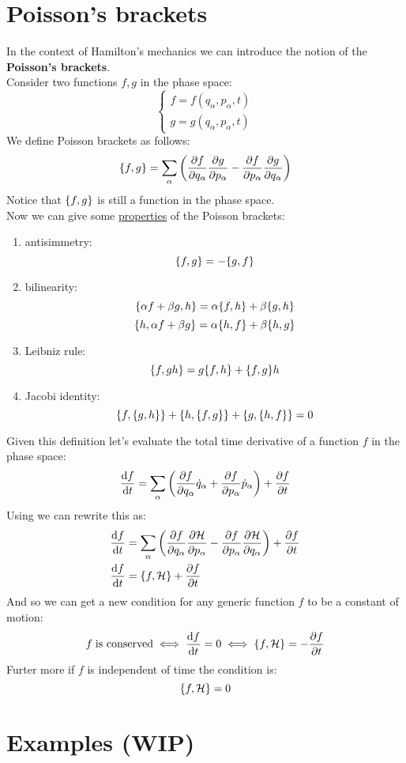 \section{Poisson's brackets}
In the context of Hamilton's mechanics we can introduce the notion of the \textbf{Poisson's brackets}.\\
Consider two functions $f,g$ in the phase space:
\begin{equation}
    \begin{cases}
        f = f(q_{\alpha},p_{\alpha},t)\\
        g = g(q_{\alpha},p_{\alpha},t)
    \end{cases}
\end{equation}
We define Poisson brackets as follows:
\begin{equation}
    \pb{f}{g} = \bigsum_{\alpha}\brackets{\pdv{f}{q_{\alpha}}\pdv{g}{p_\alpha} - \pdv{f}{p_{\alpha}}\pdv{g}{q_{\alpha}}}
\end{equation}
Notice that $\pb{f}{g}$ is still a function in the phase space.\\
Now we can give some \underline{properties} of the Poisson brackets:
\begin{enumerate}
    \item antisimmetry: \[\pb{f}{g} = - \pb{g}{f}\]
    \item bilinearity:
    \[\pb{\alpha f + \beta g}{h} = \alpha\pb{f}{h}+ \beta\pb{g}{h}\]
    \[\pb{h}{\alpha f + \beta g} = \alpha\pb{h}{f}+ \beta\pb{h}{g}\]
    \item Leibniz rule: \[\pb{f}{gh} = g\pb{f}{h} + \pb{f}{g}h\]
    \item Jacobi identity: \[\pb{f}{\pb{g}{h}} + \pb{h}{\pb{f}{g}} + \pb{g}{\pb{h}{f}} = 0\]
\end{enumerate}
Given this definition let's evaluate the total time derivative of a function $f$ in the phase space:
\begin{equation}
    \dv{f}{t} = \bigsum_{\alpha}\brackets{\pdv{f}{q_{\alpha}}\dot{q}_{\alpha} + \pdv{f}{p_{\alpha}}\dot{p}_{\alpha}} + \pdv{f}{t}
\end{equation}
Using \hamiltonref\;we can rewrite this as:
\begin{equation}
    \begin{split}
        \dv{f}{t} &= \bigsum_{\alpha}\brackets{\pdv{f}{q_{\alpha}}\pdv{\hamfun}{p_{\alpha}} - \pdv{f}{p_{\alpha}}\pdv{\hamfun}{q_{\alpha}}} + \pdv{f}{t}\\
        \dv{f}{t} &= \pb{f}{\hamfun} + \pdv{f}{t}
    \end{split}
\end{equation}
And so we can get a new condition for any generic function $f$ to be a constant of motion:
\begin{equation}
    f\;\text{is conserved} \iff \dv{f}{t} = 0 \iff \pb{f}{\hamfun} = -\pdv{f}{t}
\end{equation}
Furter more if $f$ is independent of time the condition is:
\begin{equation}
    \pb{f}{\hamfun} = 0
\end{equation}
\section{Examples (WIP)}
